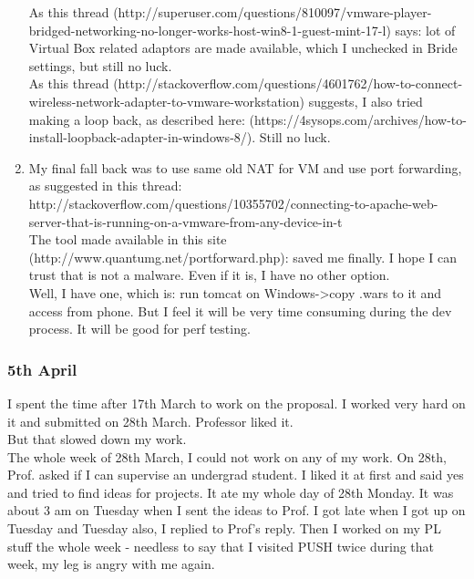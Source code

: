 \documentclass[11pt]{article}
\begin{document}
\begin{enumerate}
As this thread (http://superuser.com/questions/810097/vmware-player-bridged-networking-no-longer-works-host-win8-1-guest-mint-17-l) says: lot of 
Virtual Box related adaptors are made available, which I unchecked in Bride settings, but still no luck.\\

As this thread (http://stackoverflow.com/questions/4601762/how-to-connect-wireless-network-adapter-to-vmware-workstation) suggests, I also tried 
making a loop back, as described here: (https://4sysops.com/archives/how-to-install-loopback-adapter-in-windows-8/). Still no luck.

\item My final fall back was to use same old NAT for VM and use port forwarding, as suggested in this thread: 
http://stackoverflow.com/questions/10355702/connecting-to-apache-web-server-that-is-running-on-a-vmware-from-any-device-in-t\\
The tool made available in this site (http://www.quantumg.net/portforward.php): saved me finally. I hope I can trust that is not a malware. Even if 
it 
is, I have no other option. \\

Well, I have one, which is: run tomcat on Windows->copy .wars to it and access from phone. But I feel it will be very time consuming during the dev 
process. It will be good for perf testing.

\end{enumerate}

\subsubsection*{5th April}
I spent the time after 17th March to work on the proposal. I worked very hard on it and submitted on 28th March. Professor liked it. \\
But that slowed down my work.\\

The whole week of 28th March, I could not work on any of my work. On 28th, Prof. asked if I can supervise an undergrad student. I liked it at first 
and said yes and tried to find ideas for projects. It ate my whole day of 28th Monday. It was about 3 am on Tuesday when I sent the ideas to Prof. I 
got late when I got up on Tuesday and Tuesday also, I replied to Prof's reply. Then I worked on my PL stuff the whole week - needless to say that I 
visited PUSH twice during that week, my leg is angry with me again.\\
\end{document}
